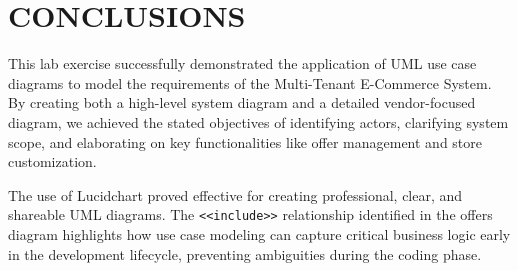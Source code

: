 \chapter{CONCLUSIONS}\label{ch:conclusion}

This lab exercise successfully demonstrated the application of UML use case diagrams to model the requirements of the Multi-Tenant E-Commerce System. By creating both a high-level system diagram and a detailed vendor-focused diagram, we achieved the stated objectives of identifying actors, clarifying system scope, and elaborating on key functionalities like offer management and store customization.

The use of Lucidchart proved effective for creating professional, clear, and shareable UML diagrams. The \texttt{\textless{}\textless{}include\textgreater{}\textgreater{}} relationship identified in the offers diagram highlights how use case modeling can capture critical business logic early in the development lifecycle, preventing ambiguities during the coding phase.